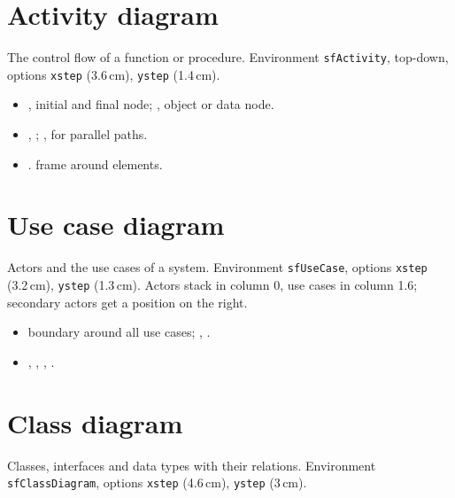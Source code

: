 \section{Activity diagram}

The control flow of a function or procedure. Environment \texttt{sfActivity}, top-down, options \texttt{xstep} (3.6\,cm), \texttt{ystep} (1.4\,cm).

\begin{itemize}
  \item {},  initial and final node; ,  object or data node.
  \item {}, ; ,  for parallel paths.
  \item {}.  frame around elements.
\end{itemize}


\section{Use case diagram}

Actors and the use cases of a system. Environment \texttt{sfUseCase}, options \texttt{xstep} (3.2\,cm), \texttt{ystep} (1.3\,cm). Actors stack in column 0, use cases in column 1.6; secondary actors get a position on the right.

\begin{itemize}
  \item {} boundary around all use cases; , .
  \item {}, , , .
\end{itemize}


\section{Class diagram}

Classes, interfaces and data types with their relations. Environment \texttt{sfClassDiagram}, options \texttt{xstep} (4.6\,cm), \texttt{ystep} (3\,cm).

